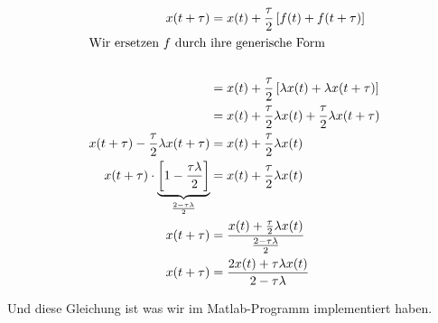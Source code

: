 \documentclass[ngerman,a4paper]{scrartcl}
\begin{document}
\begin{align*}
  x(t + \tau) &= x(t) + \frac{\tau}{2} \left[f(t) + f(t+\tau)\right]\\
  \intertext{Wir ersetzen $f$ durch ihre generische Form}\\
  &= x(t) + \frac{\tau}{2} \left[ \lambda x(t) + \lambda x(t+\tau) \right]\\
  &= x(t) + \frac{\tau}{2} \lambda x(t) + \frac{\tau}{2} \lambda x(t+\tau)\\
  x(t + \tau) - \frac{\tau}{2} \lambda x(t+\tau) &= x(t) + \frac{\tau}{2} \lambda x(t)\\
  x(t + \tau)\cdot \underbrace{\left[1 - \frac{\tau\lambda}{2}\right]}_{\frac{2-\tau\lambda}{2}} &= x(t) + \frac{\tau}{2} \lambda x(t)\\
  x(t + \tau) &= \frac{x(t) + \frac{\tau}{2} \lambda x(t)}{\frac{2-\tau\lambda}{2}}\\
  x(t + \tau) &= \frac{2x(t) + \tau\lambda x(t)}{2 - \tau\lambda}
\end{align*}

Und diese Gleichung ist was wir im Matlab-Programm implementiert
haben.
\end{document}
